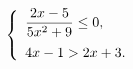 \begin{ex}[type=ineq_system]
	\begin{condition}
		\( \left\{
		\begin{array}{l}
			\dfrac{2x-5}{5x^2+9}\le0,\vspace{2mm}\\
			4x-1>2x+3.
		\end{array}
		\right. \)
	\end{condition}
\end{ex}